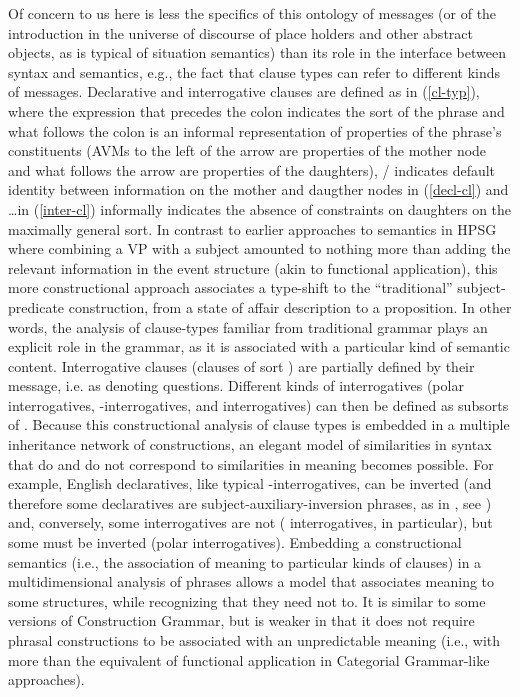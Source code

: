 \documentclass[output=paper]{langsci/langscibook}
\begin{document}
Of concern to us here is less the specifics of this ontology of messages (or of the introduction in the universe of discourse of place holders and other abstract objects, as is typical of situation semantics) than its role in the interface between syntax and semantics, e.g., the fact that clause types can refer to different kinds of messages. Declarative and interrogative clauses are defined as in (\ref{cl-typ}), where the expression that precedes the colon indicates the sort of the phrase and what follows the colon is an informal representation of properties of the phrase's constituents (AVMs to the left of the arrow are properties of the mother node and what follows the arrow are properties of the daughters), / indicates default identity between information on the mother and daugther nodes in (\ref{decl-cl}) and \ldots in (\ref{inter-cl}) informally indicates the absence of constraints on daughters on the maximally general  sort. In contrast to earlier approaches to semantics in HPSG where combining a VP with a subject amounted to nothing more than adding the relevant information in the event structure (akin to functional application), this more constructional approach associates a type-shift to the ``traditional'' subject-predicate construction, from a state of affair description to a proposition. In other words, the analysis of clause-types familiar from traditional grammar plays an explicit role in the grammar, as it is associated  with a particular kind of semantic content.  Interrogative clauses (clauses of sort ) are partially defined by their message, i.e. as denoting questions. Different kinds of interrogatives (polar interrogatives, -interrogatives, and  interrogatives) can then be defined as subsorts of . Because this constructional analysis of clause types is embedded in a multiple inheritance network of constructions, an elegant model of similarities in syntax that do and do not correspond to similarities in meaning becomes possible. For example, English declaratives, like typical -interrogatives, can be inverted (and therefore some declaratives are subject-auxiliary-inversion phrases, as in , see \citealt{Fillmore1999}) and, conversely, some interrogatives are not ( interrogatives, in particular), but some must be inverted (polar interrogatives). Embedding a constructional semantics (i.e., the association of meaning to particular kinds of clauses) in a multidimensional analysis of phrases allows a model that associates meaning to some structures, while recognizing that they need not to. It is similar to some versions of Construction Grammar, but is weaker in that it does not require phrasal constructions to be associated with an unpredictable meaning (i.e., with more than the equivalent of functional application in Categorial Grammar-like approaches). 
\end{document}
